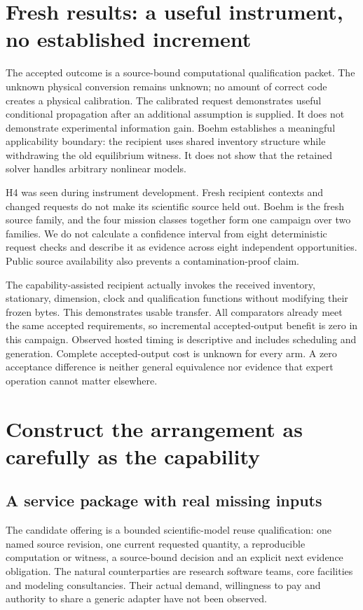 \section{Fresh results: a useful instrument, no established increment}


The accepted outcome is a source-bound computational qualification packet. The unknown physical conversion remains unknown; no amount of correct code creates a physical calibration. The calibrated request demonstrates useful conditional propagation after an additional assumption is supplied. It does not demonstrate experimental information gain. Boehm establishes a meaningful applicability boundary: the recipient uses shared inventory structure while withdrawing the old equilibrium witness. It does not show that the retained solver handles arbitrary nonlinear models.

H4 was seen during instrument development. Fresh recipient contexts and changed requests do not make its scientific source held out. Boehm is the fresh source family, and the four mission classes together form one campaign over two families. We do not calculate a confidence interval from eight deterministic request checks and describe it as evidence across eight independent opportunities. Public source availability also prevents a contamination-proof claim.

The capability-assisted recipient actually invokes the received inventory, stationary, dimension, clock and qualification functions without modifying their frozen bytes. This demonstrates usable transfer. All comparators already meet the same accepted requirements, so incremental accepted-output benefit is zero in this campaign. Observed hosted timing is descriptive and includes scheduling and generation. Complete accepted-output cost is unknown for every arm. A zero acceptance difference is neither general equivalence nor evidence that expert operation cannot matter elsewhere.

\section{Construct the arrangement as carefully as the capability}
\subsection{A service package with real missing inputs}
The candidate offering is a bounded scientific-model reuse qualification: one named source revision, one current requested quantity, a reproducible computation or witness, a source-bound decision and an explicit next evidence obligation. The natural counterparties are research software teams, core facilities and modeling consultancies. Their actual demand, willingness to pay and authority to share a generic adapter have not been observed.


